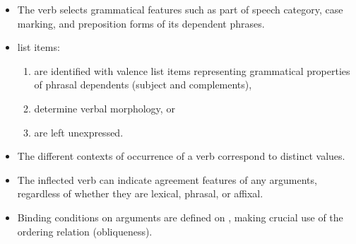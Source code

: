 \documentclass[output=paper
 	        ,biblatex
                ,babelshorthands
                ,newtxmath
                ,draftmode
                ,colorlinks, citecolor=brown
]{langscibook}
\begin{document}
\begin{itemize}
\item The verb selects grammatical features such as part of speech
category, case marking, and preposition forms of its dependent
phrases.
\item \argst list items:
\begin{enumerate}
\item are identified with valence list items
representing grammatical properties of phrasal dependents (subject and
complements),
\item determine verbal morphology, or
\item are left unexpressed.
\end{enumerate}
\item The different contexts of occurrence of a verb correspond to distinct \argst values.
\item The inflected verb can indicate agreement features of any arguments,
regardless of whether they are lexical, phrasal, or affixal.
\item Binding conditions on arguments are defined on \argst, making
crucial use of the ordering relation (obliqueness).
\end{itemize}
\end{document}
